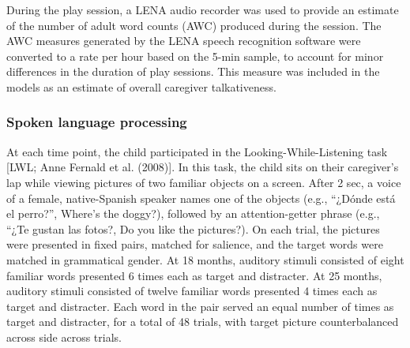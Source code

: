 \documentclass[
  man,floatsintext]{apa6}
\begin{document}
During the play session, a LENA audio recorder was used to provide an estimate of the number of adult word counts (AWC) produced during the session. The AWC measures generated by the LENA speech recognition software were converted to a rate per hour based on the 5-min sample, to account for minor differences in the duration of play sessions. This measure was included in the models as an estimate of overall caregiver talkativeness.

\hypertarget{spoken-language-processing}{%
\subsubsection{Spoken language processing}\label{spoken-language-processing}}

At each time point, the child participated in the Looking-While-Listening task {[}LWL; Anne Fernald et al. (2008){]}. In this task, the child sits on their caregiver's lap while viewing pictures of two familiar objects on a screen. After 2 sec, a voice of a female, native-Spanish speaker names one of the objects (e.g., ``¿Dónde está el perro?'', Where's the doggy?), followed by an attention-getter phrase (e.g., ``¿Te gustan las fotos?, Do you like the pictures?). On each trial, the pictures were presented in fixed pairs, matched for salience, and the target words were matched in grammatical gender. At 18 months, auditory stimuli consisted of eight familiar words presented 6 times each as target and distracter. At 25 months, auditory stimuli consisted of twelve familiar words presented 4 times each as target and distracter. Each word in the pair served an equal number of times as target and distracter, for a total of 48 trials, with target picture counterbalanced across side across trials.
\end{document}
